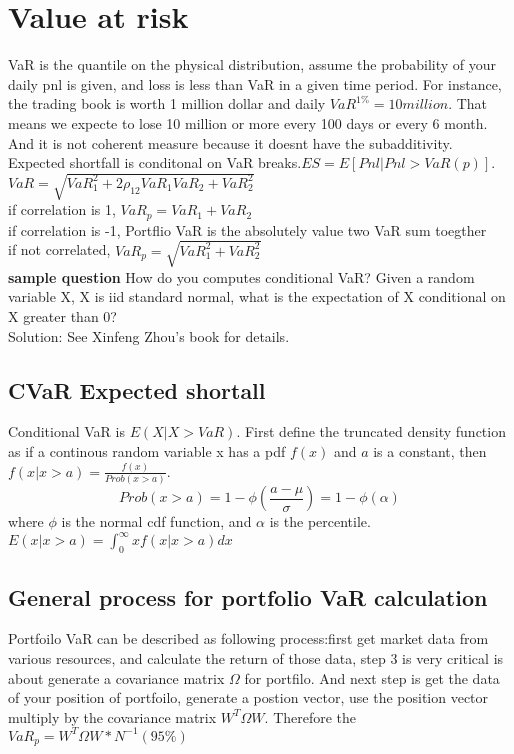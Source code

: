 \documentclass[a4paper,11pt]{article}
\begin{document}
\section{Value at risk}
VaR is the quantile on the physical distribution, assume the probability of your daily pnl is given, and loss is less than VaR in a given time period. For instance, the trading book is worth 1 million dollar and daily $VaR^{1\%}=10million$. That means we expecte to lose 10 million or more every 100 days or every 6 month. And it is not coherent measure because it doesnt have the subadditivity. Expected shortfall is conditonal on VaR breaks.$ES=E[Pnl|Pnl>VaR(p)]$.\\
$VaR=\sqrt{VaR_1^2+2\rho_{12}VaR_1 VaR_2+VaR_2^2}$\\
if correlation is 1, $VaR_p=VaR_1+VaR_2$\\
if correlation is -1, Portflio VaR is the absolutely value two VaR sum toegther\\
if  not correlated, $VaR_p=\sqrt{VaR_1^2+VaR_2^2}$\\

{\bf sample question}
How do you computes conditional VaR? Given a random variable X, X is iid standard normal, what is the expectation of X conditional on X greater than 0?\\
Solution: See Xinfeng Zhou's book for details.\\
\subsection{CVaR Expected shortall}
Conditional VaR is $E(X|X>VaR)$. First define the truncated density function as if a continous random variable x has a pdf $f(x)$ and $a$ is a constant, then $f(x|x>a)=\frac{f(x)}{Prob(x>a)}$. \\
$$
Prob(x>a)=1-\phi(\frac{a-\mu}{\sigma})=1-\phi(\alpha)
$$
where $\phi$ is the normal cdf function, and $\alpha$ is the percentile. \\
$E(x|x>a)=\int_0^{\infty} xf(x|x>a) dx$
\subsection{General process for portfolio VaR calculation}
Portfoilo VaR can be described as following process:first get market data from various resources, and calculate the return of those data, step 3 is very critical is about generate a covariance matrix $\Omega$ for portfilo. And next step is get the data of your position of portfoilo, generate a postion vector, use the position vector multiply by the covariance matrix $W^T\Omega W$. Therefore the $VaR_p=W^T\Omega W*N^{-1}(95 \%)$
\end{document}
